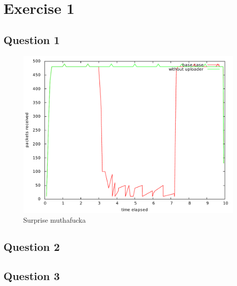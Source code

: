 \documentclass[10pt,a4paper]{article}
\begin{document}


\section{Exercise 1}
\subsection{Question 1}

\begin{figure}[p]
    \centering
    \includegraphics[width=\textwidth]{../part1/q1/plots/1.pdf}
    \caption{Surprise muthafucka}
    \label{fig:awesome_image}
\end{figure}

\subsection{Question 2}
\subsection{Question 3}
\end{document}

